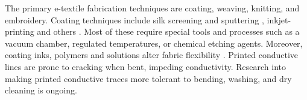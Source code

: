 


The primary e-textile fabrication techniques are coating, weaving, knitting, and embroidery.
Coating techniques include silk screening and sputtering \cite{kim2010electrical}, inkjet-printing \cite{sirringhaus2000high} and others  \cite{castano2014smart}. %
Most of these require special tools and processes such as a vacuum chamber, regulated temperatures, or chemical etching agents. 
Moreover, coating inks, polymers and solutions alter fabric flexibility \cite{farboodmanesh2005effect}. 
Printed conductive lines are prone to cracking when bent, impeding conductivity. 
Research into making printed conductive traces more tolerant to bending, washing, and dry cleaning is ongoing.




